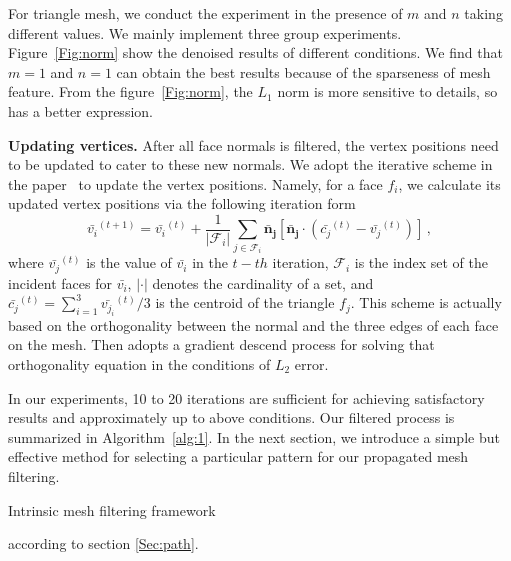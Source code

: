 For triangle mesh, we conduct the experiment in the presence of $m$ and $n$ taking different values.
We mainly implement three group experiments. Figure~\ref{Fig:norm} show the denoised results of different conditions.
We find that $m=1$ and $n=1$ can obtain the best results because of the sparseness of mesh feature.
From the figure~\ref{Fig:norm}, the $L_1$ norm is more sensitive to details, so has a better expression.

 {\bfseries Updating vertices.} After all face normals is filtered, the vertex positions need to be updated to cater to these new normals.
 We adopt the iterative scheme in the paper~\cite{sun2007fast} to update the vertex positions.
 Namely, for a face $f_{i}$, we calculate its updated vertex positions via the following iteration form
 \begin{equation}
 \label{vertexupdate}
 \bar{v_{i}}^{(t+1)} = \bar{v_{i}}^{(t)} + \frac{1}{|{\mathcal{F}_{i}}|}\sum_{j\in\mathcal{F}_{i}}\mathbf{\bar{n}_{j}}[\mathbf{\bar{n}_{j}}\cdot(\bar{c_{j}}^{(t)}-\bar{v_{j}}^{(t)})]\, ,
 \end{equation}
 where $\bar{v_{j}}^{(t)}$ is the value of $\bar{v_{i}}$ in the $t-th$ iteration,
 $\mathcal{F}_{i}$ is the index set of the incident faces for $\bar{v_{i}}$,
 $|\cdot|$ denotes the cardinality of a set,
 and $\bar{c_{j}}^{(t)} = \sum_{i=1}^{3}\bar{v_{j_{i}}}^{(t)}/3$ is the centroid of the triangle $f_{j}$.
 This scheme is actually based on the orthogonality between the normal and the three edges of each face on the mesh.
 Then adopts a gradient descend process for solving that orthogonality equation in the conditions of  $L_2$ error.

 In our experiments, 10 to 20 iterations are sufficient for achieving satisfactory results and approximately up to above conditions.
 Our filtered process is summarized in Algorithm~\ref{alg:1}.
 In the next section, we introduce a simple but effective method for selecting a particular pattern for our propagated mesh filtering.



\begin{algorithm}\caption{Intrinsic mesh filtering framework}
\label{alg:1}
\begin{algorithmic}
 according to section \ref{Sec:path}.
\end{algorithmic}
\end{algorithm}



